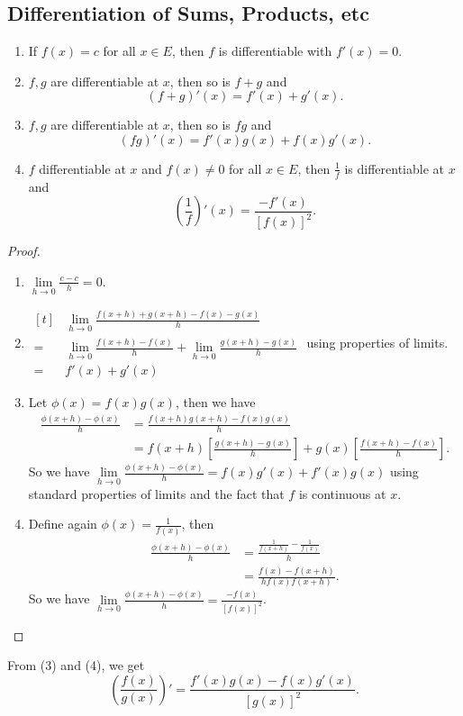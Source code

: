 \subsection{Differentiation of Sums, Products, etc}
\begin{property}
\leavevmode
\begin{enumerate}
    \label{derivprop}
    \item If \(f(x) = c\) for all \(x \in E\), then \(f\) is differentiable with \(f'(x) = 0\).
    \item \(f, g\) are differentiable at \(x\), then so is \(f + g\) and
    \[
        (f+g)'(x) = f'(x) + g'(x).
    \]
    \item \(f,g\) are differentiable at \(x\), then so is \(fg\) and
    \[
        (fg)'(x) = f'(x)g(x) + f(x)g'(x).
    \]
    \item \(f\) differentiable at \(x\) and \(f(x) \neq 0\) for all \(x \in E\), then \(\frac{1}{f}\) is differentiable at \(x\) and
    \[
        (\frac{1}{f})'(x) = \frac{-f'(x)}{[f(x)]^2}.
    \]
\end{enumerate}
\end{property}
\begin{proof}
    \leavevmode
    \begin{enumerate}
        \item \(\lim\limits_{h \to 0} \frac{c-c}{h} = 0\).
        \item \(\begin{aligned}[t]
            &\lim\limits_{h \to 0} \frac{f(x+h) + g(x+h) - f(x) - g(x)}{h}\\
        =& \lim\limits_{h \to 0} \frac{f(x+h)-f(x)}{h} + \lim\limits_{h \to 0} \frac{g(x+h) - g(x)}{h}\\ =& f'(x) + g'(x)\end{aligned}\) using properties of limits.
        \item Let \(\phi(x) = f(x)g(x)\), then we have
        \begin{align*}
            \frac{\phi(x + h) - \phi(x)}{h} &= \frac{f(x+h)g(x+h) - f(x)g(x)}{h}\\
            &= f(x + h)[\frac{g(x+h)-g(x)}{h}] + g(x)[\frac{f(x+h)-f(x)}{h}].
        \end{align*}
        So we have \(\lim\limits_{h \to 0} \frac{\phi(x + h) - \phi(x)}{h} = f(x)g'(x) + f'(x)g(x)\) using standard properties of limits and the fact that \(f\) is continuous at \(x\).
        \item Define again \(\phi(x) = \frac{1}{f(x)}\), then
        \begin{align*}
            \frac{\phi(x + h) - \phi(x)}{h} &= \frac{\frac{1}{f(x + h)} - \frac{1}{f(x)}}{h}\\
            &= \frac{f(x) - f(x+h)}{hf(x)f(x+h)}.
        \end{align*}
        So we have \(\lim\limits_{h \to 0} \frac{\phi(x+h) - \phi(x)}{h} = \frac{-f(x)}{[f(x)]^2}\).
    \end{enumerate}
\end{proof}
\begin{remark}
    From (3) and (4), we get
    \[
        \left(\frac{f(x)}{g(x)}\right)' = \frac{f'(x)g(x) - f(x)g'(x)}{[g(x)]^2}.
    \] 
\end{remark}